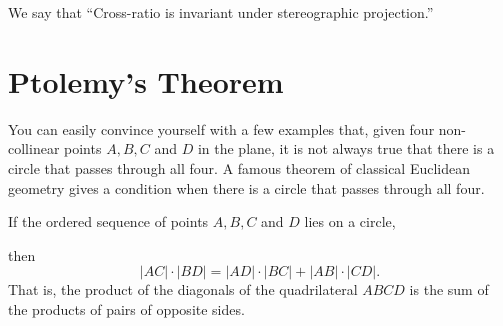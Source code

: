 \documentclass{ximera}
\begin{document}
We say that ``Cross-ratio is invariant under stereographic
projection.''







\section{Ptolemy's Theorem}

You can easily convince yourself with a few examples that, given four
non-collinear points $A,B,C$ and $D$ in the plane, it is not always
true that there is a circle that passes through all four. A famous
theorem of classical Euclidean geometry gives a condition when there
is a circle that passes through all four.

\begin{theorem}[Ptolemy] If the ordered sequence of points $A,B,C$ and $D$ lies on a circle,
\begin{image}
\end{image}
then%
\[
\left\vert AC\right\vert \cdot\left\vert BD\right\vert
=\left\vert AD\right\vert \cdot\left\vert BC\right\vert
+\left\vert AB\right\vert \cdot\left\vert CD\right\vert
.
\]
That is, the product of the diagonals of the quadrilateral $ABCD$ is the sum
of the products of pairs of opposite sides.
\end{theorem}
\end{document}
